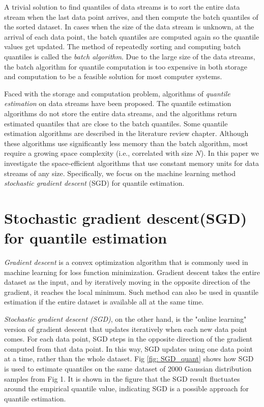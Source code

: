 A trivial solution to find quantiles of data streams is to sort the entire data stream when the last data point arrives, and then compute the batch quantiles of the sorted dataset.  In cases when the size of the data stream is unknown, at the arrival of each data point, the batch quantiles are computed again so the quantile values get updated. The method of repeatedly sorting and computing batch quantiles is called the \textit{batch algorithm}. Due to the large size of the data streams, the batch algorithm for quantile computation is too expensive in both storage and computation to be a feasible solution for most computer systems.

Faced with the storage and computation problem, algorithms of \textit{quantile estimation} on data streams have been proposed. The quantile estimation algorithms do not store the entire data streams, and the algorithms return estimated quantiles that are close to the batch quantiles. Some quantile estimation algorithms are described in the literature review chapter. Although these algorithms use significantly less memory than the batch algorithm, most require a growing space complexity (i.e., correlated with size $N$). In this paper we investigate the space-efficient algorithms that use constant memory units for data streams of any size. Specifically, we focus on the machine learning method \textit{stochastic gradient descent} (SGD) for quantile estimation. 

\section{Stochastic gradient descent(SGD) for quantile estimation}
\label{sec: intro_GD_SGD}

\textit{Gradient descent} is a convex optimization algorithm that is commonly used in machine learning for loss function minimization. Gradient descent takes the entire dataset as the input, and by iteratively moving in the opposite direction of the gradient, it reaches the local minimum. Such method can also be used in quantile estimation if the entire dataset is available all at the same time.

\textit{Stochastic gradient descent (SGD)}, on the other hand, is the "online learning" version of gradient descent that updates iteratively when each new data point comes. For each data point, SGD steps in the opposite direction of the gradient computed from that data point. In this way, SGD updates using one data point at a time, rather than the whole dataset.
Fig \ref{fig: SGD_quant} shows how SGD is used to estimate quantiles on the same dataset of 2000 Gaussian distribution samples from Fig 1. It is shown in the figure that the SGD result fluctuates around the empirical quantile value, indicating SGD is a possible approach for quantile estimation.

